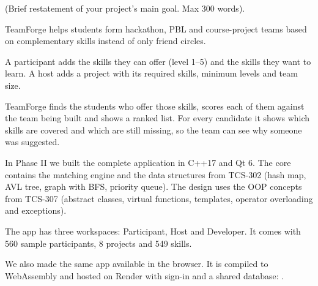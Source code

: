 \newpage
\TFpagetop
{}

  {(Brief restatement of your project's main goal. Max 300 words).}
\TFgap{6.1bp}
\begin{answerbox}
\begin{tfbullets}
\item TeamForge helps students form hackathon, PBL and course-project teams based on complementary
      skills instead of only friend circles.
\item A participant adds the skills they can offer (level 1--5) and the skills they want to learn.
      A host adds a project with its required skills, minimum levels and team size.
\item TeamForge finds the students who offer those skills, scores each of them against the team being
      built and shows a ranked list. For every candidate it shows which skills are covered and which
      are still missing, so the team can see why someone was suggested.
\item In Phase II we built the complete application in C++17 and Qt 6. The core contains the matching
      engine and the data structures from TCS-302 (hash map, AVL tree, graph with BFS, priority queue).
      The design uses the OOP concepts from TCS-307 (abstract classes, virtual functions, templates,
      operator overloading and exceptions).
\item The app has three workspaces: Participant, Host and Developer. It comes with 560 sample
      participants, 8 projects and 549 skills.
\item We also made the same app available in the browser. It is compiled to WebAssembly and hosted on
      Render with sign-in and a shared database: .
\end{tfbullets}
\end{answerbox}

